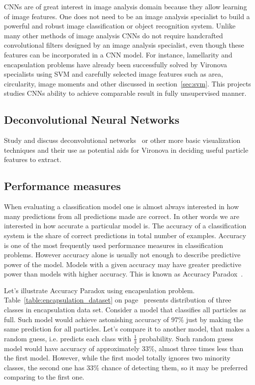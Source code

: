\documentclass[a4paper, 11pt, table]{article}
\begin{document}
CNNs are of great interest in image analysis domain because they allow learning of image features. One does not need to be an image analysis specialist to build a powerful and robust image classification or object recognition system. Unlike many other methods of image analysis CNNs do not require handcrafted convolutional filters designed by an image analysis specialist, even though these features can be incorporated in a CNN model. For instance, lamellarity and encapsulation problems have already been successfully solved by Vironova specialists using SVM and carefully selected image features such as area, circularity, image moments and other discussed in section~\ref{sec:svm}. This projects studies CNNs ability to achieve comparable result in fully unsupervised manner. 


\subsection{Deconvolutional Neural Networks}
Study and discuss deconvolutional networks~\cite{Zeiler2014} or other more basic visualization techniques and their use as potential aids for Vironova in deciding useful particle features to extract.

\subsection{Performance measures}

When evaluating a classification model one is almost always interested in how many predictions from all predictions made are correct. In other words we are interested in how accurate a particular model is. The accuracy of a classification system is the share of correct predictions in total number of examples. Accuracy  is one of the most frequently used performance measures in classification problems. However accuracy alone is usually not enough to describe predictive power of the model. Models with a given accuracy may have greater predictive power than models with higher accuracy. This is known as Accuracy Paradox~\cite{zhu2007knowledge}.

Let's illustrate Accuracy Paradox using encapsulation problem. Table~\ref{table:encapsulation_dataset} on page~\pageref{table:encapsulation_dataset} presents distribution of three classes in encapsulation data set. Consider a model that classifies all particles as full. Such model would achieve astonishing accuracy of $97\%$ just by making the same prediction for all particles. Let's compare it to another model, that makes a random guess, i.e. predicts each class with $\frac{1}{3}$ probability. Such random guess model would have accuracy of approximately $33\%$, almost three times less than the first model. However, while the first model totally ignores two minority classes, the second one has $33\%$ chance of detecting them, so it may be preferred comparing to the first one. 
\end{document}
